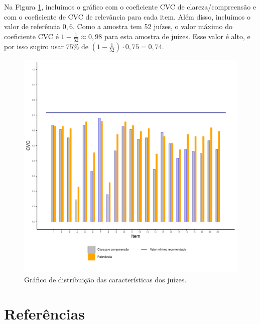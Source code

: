 \documentclass[
]{article}
\begin{document}
Na Figura \ref{fig:grafico2V2}, incluimos o gráfico com o coeficiente CVC de clareza/compreensão e com o coeficiente de CVC de relevância para cada item. Além disso, incluímos o valor de referência \(0,6\). Como a amostra tem 52 juízes, o valor máximo do coeficiente CVC é \(1-\frac{1}{52}\approx 0,98\) para esta amostra de juízes. Esse valor é alto, e por isso sugiro usar \(75\%\) de \(\left(1 - \frac{1}{52}\right) \cdot 0,75 = 0,74\).

\begin{figure}[htbp]

{\centering \includegraphics[width=0.9\linewidth]{../figures/grafico2_80_perc} 

}

\caption{Gráfico de distribuição das características dos juízes.}\label{fig:grafico2V2}
\end{figure}

\cleardoublepage

\hypertarget{referuxeancias}{%
\section*{Referências}\label{referuxeancias}}
\end{document}
